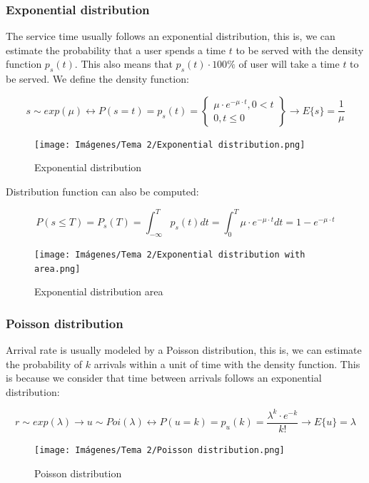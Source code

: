 \documentclass[
	12pt,
	twoside
]{book}
\begin{document}
\subsubsection{Exponential distribution}

The service time usually follows an exponential distribution, this is, we can estimate the probability that a user spends a time $t$ to be served with the density function $p_s(t)$. This also means that $p_s(t) \cdot 100\%$ of user will take a time $t$ to be served. We define the density function:

$$
	s \sim exp(\mu) \leftrightarrow P(s = t) = p_s(t) =
	\begin{Bmatrix}
		\mu \cdot e^{- \mu \cdot t}, 0 < t \\
		0, t \leq 0
	\end{Bmatrix}
	\rightarrow
	E\{s\} = \frac{1}{\mu}
$$

\begin{figure}[H]
	\centering
	\texttt{[image: Imágenes/Tema 2/Exponential distribution.png]}
	\caption{
		\label{fig:unit2_exp}
		Exponential distribution
	}
\end{figure}

Distribution function can also be computed:

$$
	P(s \leq T) =
	P_s(T) =
	\int_{-\infty}^{T} p_s(t) dt =
	\int_{0}^{T} \mu \cdot e^{- \mu \cdot t} dt =
	1 - e^{- \mu \cdot t}
$$

\begin{figure}[H]
	\centering
	\texttt{[image: Imágenes/Tema 2/Exponential distribution with area.png]}
	\caption{
		\label{fig:unit2_exp_area}
		Exponential distribution area
	}
\end{figure}

\subsubsection{Poisson distribution}

Arrival rate is usually modeled by a Poisson distribution, this is, we can estimate the probability of $k$ arrivals within a unit of time with the density function. This is because we consider that time between arrivals follows an exponential distribution:

$$
	r \sim exp(\lambda) \rightarrow
	u \sim Poi(\lambda) \leftrightarrow
	P(u = k) = p_u(k) =
	\frac {\lambda^k \cdot e^{-k}} {k!} \rightarrow
	E\{u\} = \lambda
$$

\begin{figure}[H]
	\centering
	\texttt{[image: Imágenes/Tema 2/Poisson distribution.png]}
	\caption{
		\label{fig:unit2_poi}
		Poisson distribution
	}
\end{figure}
\end{document}
